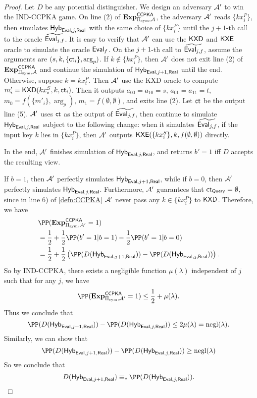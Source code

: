 \begin{proof}
    Let $D$ be any potential distinguisher. We design an adversary $\mathcal{A}'$ to win the IND-CCPKA game. On line (2) of $\mathbf{Exp}^{\mathsf{CCPKA}}_{\Pi_{\text{sym}}, \mathcal{A}}$, the adversary $\mathcal{A}'$ reads $\{kx_i^P\}$, then simulates $\mathsf{Hyb}_{\mathsf{Eval}, j, \mathsf{Real}}$ with the same choice of $\{kx_i^P\}$ until the $j + 1$-th call to the oracle $\widetilde{\mathsf{Eval}_{j, f}}$. It is easy to verify that $\mathcal{A}'$ can use the $\mathsf{KXD}$ and $\mathsf{KXE}$ oracle to simulate the oracle $\mathsf{Eval}_f$. On the $j + 1$-th call to $\widetilde{\mathsf{Eval}_{j, f}}$, assume the arguments are $(s, k, \{\mathsf{ct}_i\}, \arg_p)$. If $k\notin \{kx_i^P\}$, then $\mathcal{A}'$ does not exit line (2) of $\mathbf{Exp}^{\mathsf{CCPKA}}_{\Pi_{\text{sym}}, \mathcal{A}}$ and continue the simulation of $\mathsf{Hyb}_{\mathsf{Eval}, j + 1, \mathsf{Real}}$ until the end. Otherwise, suppose $k = kx_{t}^P$. Then $\mathcal{A}'$ use the KXD oracle to compute $m'_i = \mathsf{KXD}(kx_s^S, k, \mathsf{ct}_i)$. Then it outputs $a_{00} = a_{10} = s$, $a_{01} = a_{11} = t$, $m_0 = f(\{m'_i\}, \arg_p)$, $m_1 = f(\emptyset, \emptyset)$, and exits line (2). Let $\mathsf{ct}$ be the output line (5). $\mathcal{A}'$ uses $\mathsf{ct}$ as the output of $\widetilde{\mathsf{Eval}_{j, f}}$, then continue to simulate $\mathsf{Hyb}_{\mathsf{Eval}, j, \mathsf{Real}}$ subject to the following change: when it simulates $\widetilde{\mathsf{Eval}_{j, f}}$, if the input key $k$ lies in $\{kx_i^P\}$, then $\mathcal{A}'$ outputs $\mathsf{KXE}(\{kx_i^S\}, k, f(\emptyset, \emptyset))$ directly.

    In the end, $\mathcal{A}'$ finishes simulation of $\mathsf{Hyb}_{\mathsf{Eval}, j, \mathsf{Real}}$, and returns $b' = 1$ iff $D$ accepts the resulting view.

    If $b = 1$, then $\mathcal{A}'$ perfectly simulates $\mathsf{Hyb}_{\mathsf{Eval}, j + 1, \mathsf{Real}}$, while if $b = 0$, then $\mathcal{A}'$ perfectly simulates $\mathsf{Hyb}_{\mathsf{Eval}, j, \mathsf{Real}}$. Furthermore, $\mathcal{A}'$ guarantees that $\mathsf{ct}_{\mathsf{Query}} = \emptyset$, since in line 6) of \cref{defn:CCPKA} $\mathcal{A}'$ never pass any $k \in \{kx_i^P\}$ to $\mathsf{KXD}$. Therefore, we have
    \begin{align*}
     &\PP(\mathbf{Exp}^{\mathsf{CCPKA}}_{\Pi_{\sym}, \cA'} = 1) \\
     &= \frac{1}{2} + \frac{1}{2}\PP(b' = 1 | b = 1) - \frac{1}{2}\PP(b' = 1 | b = 0) \\   
     &= \frac{1}{2} + \frac{1}{2}\left(\PP(D(\Hyb_{\Eval, j + 1, \Real})) - \PP(D(\Hyb_{\Eval, j, \Real}))\right).
    \end{align*}
    So by IND-CCPKA, there exists a negligible function $\mu(\lambda)$ independent of $j$ such that for any $j$, we have
    $$\PP(\mathbf{Exp}^{\mathsf{CCPKA}}_{\Pi_{\sym}, \cA'} = 1) \leq \frac{1}{2} + \mu(\lambda).$$
    Thus we conclude that
    $$\PP(D(\Hyb_{\Eval, j + 1, \Real})) - \PP(D(\Hyb_{\Eval, j, \Real})) \leq 2\mu(\lambda) = \negl(\lambda).$$
    Similarly, we can show that
    $$\PP(D(\Hyb_{\Eval, j + 1, \Real})) - \PP(D(\Hyb_{\Eval, j, \Real})) \geq \negl(\lambda)$$
    So we conclude that
    $$D(\Hyb_{\Eval, j + 1, \Real}) \equiv_c \PP(D(\Hyb_{\Eval, j, \Real})).$$
\end{proof}
